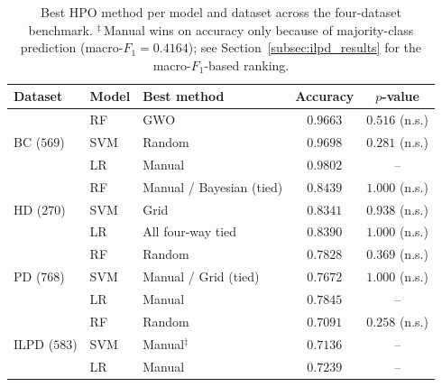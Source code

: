 \documentclass[letterpaper, 10 pt, conference]{ieeeconf}
\begin{document}
\begin{table}[h]
	\caption{Best HPO method per model and dataset across the four-dataset benchmark. $^{\ddagger}\,$Manual wins on accuracy only because of majority-class prediction (macro-$F_1 = 0.4164$); see Section~\ref{subsec:ilpd_results} for the macro-$F_1$-based ranking.}
	\label{tab:summary}
	\centering
	\scriptsize
	\begin{tabular}{|l|l|l|c|c|}
		\hline
		\textbf{Dataset} & \textbf{Model} & \textbf{Best method} & \textbf{Accuracy} & \textbf{$p$-value} \\
		\hline
		\multirow{3}{*}{BC ($569$)}
		& RF  & GWO & $0.9663$ & $0.516$ (n.s.) \\
		& SVM & Random & $0.9698$ & $0.281$ (n.s.) \\
		& LR  & Manual & $0.9802$ & -- \\
		\hline
		\multirow{3}{*}{HD ($270$)}
		& RF  & Manual / Bayesian (tied) & $0.8439$ & $1.000$ (n.s.) \\
		& SVM & Grid & $0.8341$ & $0.938$ (n.s.) \\
		& LR  & All four-way tied & $0.8390$ & $1.000$ (n.s.) \\
		\hline
		\multirow{3}{*}{PD ($768$)}
		& RF  & Random & $0.7828$ & $0.369$ (n.s.) \\
		& SVM & Manual / Grid (tied) & $0.7672$ & $1.000$ (n.s.) \\
		& LR  & Manual & $0.7845$ & -- \\
		\hline
		\multirow{3}{*}{ILPD ($583$)}
		& RF  & Random & $0.7091$ & $0.258$ (n.s.) \\
		& SVM & Manual$^{\ddagger}$ & $0.7136$ & -- \\
		& LR  & Manual & $0.7239$ & -- \\
		\hline
	\end{tabular}
\end{table}
\end{document}
